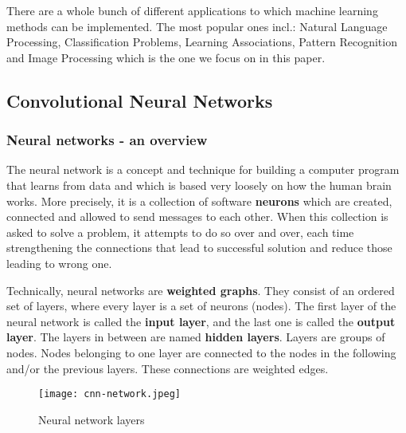 \documentclass[../Main.tex]{subfiles}
\begin{document}
    There are a whole bunch of different applications to which machine learning methods can be implemented. The most popular ones incl.: Natural Language Processing, Classification Problems, Learning Associations, Pattern Recognition and Image Processing which is the one we focus on in this paper.




\subsection{Convolutional Neural Networks}

    \subsubsection{Neural networks - an overview}
    The neural network is a concept and technique for building a computer program that learns from data and which is based very loosely on how the human brain works. More precisely, it is a collection of software \textbf{neurons} which are created, connected and allowed to send messages to each other. When this collection is asked to solve a problem, it attempts to do so over and over, each time strengthening the connections that lead to successful solution and reduce those leading to wrong one.
    
\newpage
    
     Technically, neural networks are \textbf{weighted graphs}. They consist of an ordered set of layers, where every layer is a set of neurons (nodes). The first layer of the neural network is called the \textbf{input layer}, and the last one is called the \textbf{output layer}. The layers in between are named \textbf{hidden layers}. Layers are groups of nodes. Nodes belonging to one layer are connected to the nodes in the following and/or the previous layers. These connections are weighted edges. \\ 
    \begin{figure}[h!]
        \centering
        \texttt{[image: cnn-network.jpeg]}
        \caption{Neural network layers}
        \label{fig:nn-scheme}
    \end{figure}
\end{document}
